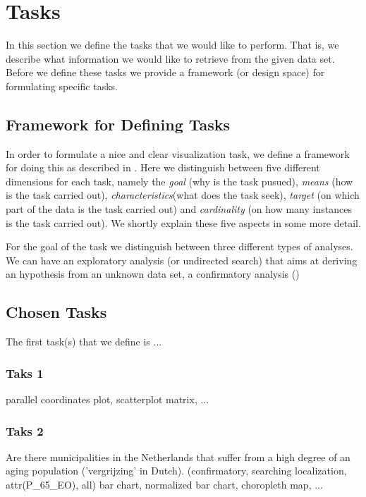 \section{Tasks}

In this section we define the tasks that we would like to perform. That is, we describe what information we would like to retrieve from the given data set. Before we define these tasks we provide a framework (or design space) for formulating specific tasks.

\subsection{Framework for Defining Tasks}
In order to formulate a nice and clear visualization task, we define a framework for doing this as described in \cite{schulz2013design}. Here we distinguish between five different dimensions for each task, namely the \textit{goal} (why is the task pusued), \textit{means} (how is the task carried out), \textit{characteristics}(what does the task seek), \textit{target} (on which part of the data is the task carried out) and \textit{cardinality} (on how many instances is the task carried out). We shortly explain these five aspects in some more detail.

For the goal of the task we distinguish between three different types of analyses. We can have an exploratory analysis (or undirected search) that aims at deriving an hypothesis from an unknown data set, a confirmatory analysis ()


\subsection{Chosen Tasks}
The first task(s) that we define is ...

\subsubsection{Taks 1}

parallel coordinates plot, scatterplot matrix, ...

\subsubsection{Taks 2}
Are there municipalities in the Netherlands that suffer from a high degree of an aging population ('vergrijzing' in Dutch).
(confirmatory, searching localization, attr(P_65_EO), all)
bar chart, normalized bar chart, choropleth map, ...
